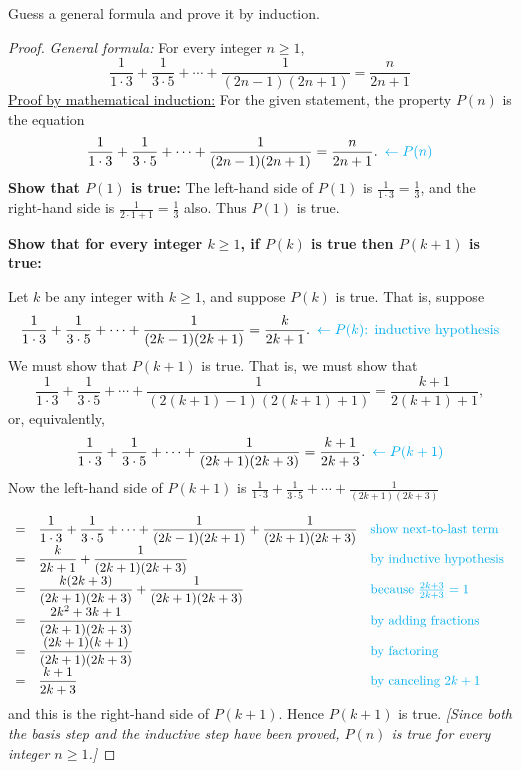 \documentclass[14pt]{extarticle}
\newcommand{\dps}{\displaystyle}
\newcommand{\from}{\leftarrow}
\newcommand{\cy}{\color{cyan}}
\begin{document}
Guess a general formula and prove it by induction.

\begin{proof}
{\it General formula:} For every integer $n \geq 1$,
\[
\dps \frac{1}{1 \cdot 3} + \frac{1}{3 \cdot 5} + \cdots + \frac{1}{(2n-1)(2n+1)} = \frac{n}{2n+1}
\]
\underline{Proof by mathematical induction:}
For the given statement, the property $P(n)$ is the equation
\[
\dps \frac{1}{1 \cdot 3} + \frac{1}{3 \cdot 5} + \cdots + \frac{1}{(2n-1)(2n+1)} = \frac{n}{2n+1}. \,\,\, {\cy \from P(n)}
\]
{\bf Show that $P(1)$ is true:} The left-hand side of $P(1)$ is $\dps \frac{1}{1 \cdot 3} = \frac{1}{3}$, and the right-hand side is $\dps \frac{1}{2 \cdot 1 + 1} = \frac{1}{3}$ also. Thus $P(1)$ is true.

{\bf Show that for every integer $k \geq 1$, if $P(k)$ is true then $P(k + 1)$ is true:}

Let $k$ be any integer with $k \geq 1$, and suppose $P(k)$ is true. That is, suppose
\[
\dps \frac{1}{1 \cdot 3} + \frac{1}{3 \cdot 5} + \cdots + \frac{1}{(2k-1)(2k+1)} = \frac{k}{2k+1}. \,\,\, {\cy \from P(k) \text{: inductive hypothesis}}
\]
We must show that $P(k + 1)$ is true. That is, we must show that
\[
\dps \frac{1}{1 \cdot 3} + \frac{1}{3 \cdot 5} + \cdots + \frac{1}{(2(k+1)-1)(2(k+1)+1)} = \frac{k+1}{2(k+1)+1}, 
\]
or, equivalently,
\[
\dps \frac{1}{1 \cdot 3} + \frac{1}{3 \cdot 5} + \cdots + \frac{1}{(2k+1)(2k+3)} = \frac{k+1}{2k+3}. \,\,\,{\cy \from P(k+1)}
\]
Now the left-hand side of $P(k + 1)$ is $\dps \frac{1}{1 \cdot 3} + \frac{1}{3 \cdot 5} + \cdots + \frac{1}{(2k+1) (2k+3)}$

\[
\begin{array}{lll}
= & \dps \frac{1}{1 \cdot 3} + \frac{1}{3 \cdot 5} + \cdots + \frac{1}{(2k-1)(2k+1)} + \frac{1}{(2k+1)(2k+3)} & \text{\cy show next-to-last term} \\
= & \dps \frac{k}{2k+1} + \frac{1}{(2k+1)(2k+3)} & \text{\cy by inductive hypothesis} \\
= & \dps \frac{k(2k+3)}{(2k+1)(2k+3)} + \frac{1}{(2k+1)(2k+3)} & \text{\cy because $\frac{2k+3}{2k+3} = 1$} \\
= & \dps \frac{2k^2+3k+1}{(2k+1)(2k+3)} & \text{\cy by adding fractions} \\
= & \dps \frac{(2k+1)(k+1)}{(2k+1)(2k+3)} & \text{\cy by factoring} \\
= & \dps \frac{k+1}{2k+3} & \text{\cy by canceling $2k+1$}
\end{array}
\]
and this is the right-hand side of $P(k + 1)$. Hence $P(k + 1)$ is true. {\it [Since both the basis step and the inductive step have been proved, $P(n)$ is true for every integer $n \geq 1$.]}
\end{proof}
\end{document}
